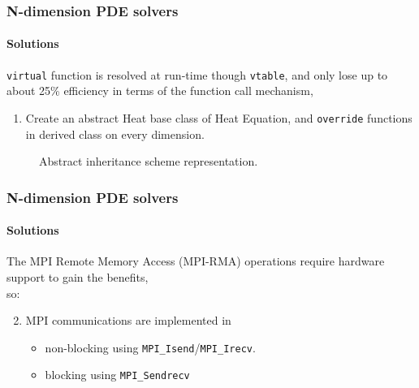 \begin{frame}
  \frametitle{N-dimension PDE solvers}
  \framesubtitle{Solutions}
  \texttt{virtual} function is resolved at run-time though \texttt{vtable}, and only lose up to about 25\% efficiency in terms of the function call mechanism, 
  \begin{enumerate}
    \item Create an abstract Heat base class of Heat Equation, and \texttt{override} functions in derived class on every dimension.
  \end{enumerate}
  \begin{figure}[htbp]
    \centering
    \caption{Abstract inheritance scheme representation.}
    \label{<label>}
  \end{figure}
\end{frame}


\begin{frame}
  \frametitle{N-dimension PDE solvers}
  \framesubtitle{Solutions}
  The MPI Remote Memory Access (MPI-RMA) operations require hardware support to gain the benefits, \\so:
  \begin{enumerate}
    \setcounter{enumi}{1}
    \item MPI communications are implemented in 
    \begin{itemize}
      \item non-blocking using \texttt{MPI\_Isend}/\texttt{MPI\_Irecv}.
      \item blocking using \texttt{MPI\_Sendrecv} 
    \end{itemize}
  \end{enumerate}
\end{frame}


